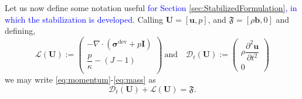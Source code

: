 \documentclass[11pt,english]{article}
\newcommand{\LM}[1]{\textcolor{blue}{#1}}
\def\disp{\boldsymbol{u}}
\def\stress{\boldsymbol{\sigma}}
\def\Identity{\mathbf{I}}
\def\UnkVariables{\boldsymbol{U}}
\def\temp{\dfrac{\partial^2 \disp}{\partial t^2}}
\begin{document}
   Let us now define some notation useful \LM{for Section \ref{sec:StabilizedFormulation}, in which the stabilization is developed}. Calling  $\UnkVariables=[\disp,p]$, and $\mathfrak{F}=[\rho\boldsymbol{b},0]$ and defining,
    \begin{equation}
        \mathcal{L}(\UnkVariables):=\left(\begin{array}{c}
        - \nabla  \cdot \left(\stress^{\text{dev}}+p\Identity\right)\\
        \dfrac{p}{\kappa}- (J-1) \\
        \end{array}\right)\label{eq:L_operator} \ \text{and} \quad
        \mathcal{D}_t\left(\UnkVariables\right):=\left(\begin{array}{c}
        \rho \temp\\
        {0}
        \end{array}\right)
    \end{equation}
   we may write \eqref{eq:momentum}-\eqref{eq:mass} as
   \begin{equation}
        \mathcal{D}_{t}\left(\boldsymbol{U}\right)+\mathcal{L}(\UnkVariables)=\mathfrak{F}. \label{eq:strong_form_operators}
    \end{equation}
 
    
    
\end{document}
